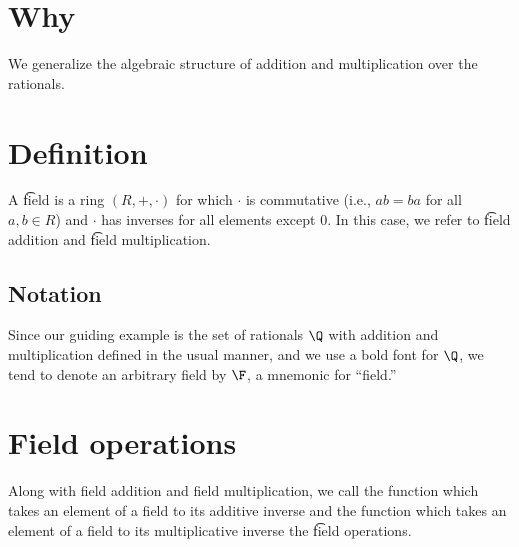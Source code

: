 
\section*{Why}

We generalize the algebraic structure of addition and multiplication over the rationals.

\section*{Definition}

A \t{field} is a ring $(R, +, \cdot  )$ for which $\cdot  $ is commutative (i.e., $ab = ba$ for all $a, b \in R$) and $\cdot  $ has inverses for all elements except $0$.
In this case, we refer to \t{field addition} and \t{field multiplication}.

\subsection*{Notation}

Since our guiding example is the set of rationals $\Q  $ with addition and multiplication defined in the usual manner, and we use a bold font for $\Q  $, we tend to denote an arbitrary field by $\F  $, a mnemonic for ``field.''

\section*{Field operations}

Along with field addition and field multiplication, we call the function which takes an element of a field to its additive inverse and the function which takes an element of a field to its multiplicative inverse the \t{field operations}.
\blankpage
